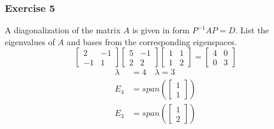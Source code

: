\documentclass{math}
\begin{document}
\subsubsection*{Exercise 5}
A diagonalization of the matrix \( A \) is given in form \( P^{-1}AP = D \).
List the eigenvalues of \( A \) and bases from the corresponding eigenspaces.
\[ \begin{bmatrix}2 & -1 \\ -1 & 1\end{bmatrix}
  \begin{bmatrix}5 & -1 \\ 2 & 2\end{bmatrix}
  \begin{bmatrix}1 & 1 \\ 1 & 2\end{bmatrix} =
  \begin{bmatrix}4 & 0 \\ 0 & 3\end{bmatrix} \]
\begin{align*}
  \lambda &= 4 \quad \lambda = 3 \\
  E_4 &= span\left(\begin{bmatrix}1 \\ 1\end{bmatrix}\right) \\
  E_3 &= span\left(\begin{bmatrix}1 \\ 2\end{bmatrix}\right)
\end{align*}
\end{document}
